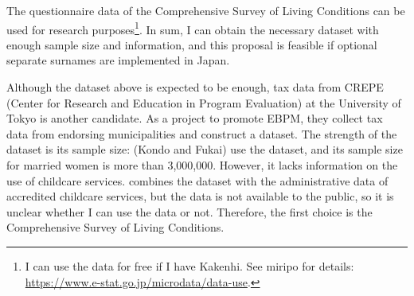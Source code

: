 \documentclass[12pt]{article}
\begin{document}
The questionnaire data of the Comprehensive Survey of Living Conditions can be used for research purposes\footnote{
  I can use the data for free if I have Kakenhi. 
  See miripo for details: \url{https://www.e-stat.go.jp/microdata/data-use}.
}.
In sum, I can obtain the necessary dataset with enough sample size and information, and this proposal is feasible if optional separate surnames are implemented in Japan.


Although the dataset above is expected to be enough, tax data from CREPE (Center for Research and Education in Program Evaluation) at the University of Tokyo is another candidate.
As a project to promote EBPM, they collect tax data from endorsing municipalities and construct a dataset. 
The strength of the dataset is its sample size: \cite{kondo2023} (Kondo and Fukai) use the dataset, and its sample size for married women is more than 3,000,000. 
However, it lacks information on the use of childcare services. 
\cite{kondo2024} combines the dataset with the administrative data of accredited childcare services, but the data is not available to the public, so it is unclear whether I can use the data or not.
Therefore, the first choice is the Comprehensive Survey of Living Conditions.



\nocite{*}


\end{document}
